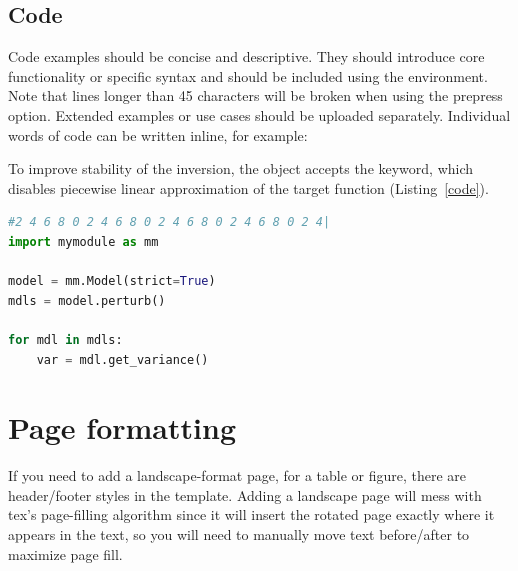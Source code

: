 \documentclass[opinion,breakmath]{seismica}
\begin{document}
	\subsection{Code}

Code examples should be concise and descriptive. They should introduce core functionality or specific syntax and should be included using the  environment. Note that lines longer than 45 characters will be broken when using the prepress option. Extended examples or use cases should be uploaded separately. Individual words of code can be written inline, for example:

To improve stability of the inversion, the  object accepts the  keyword, which disables piecewise linear approximation of the target function (Listing~\ref{code}).

\begin{lstlisting}[caption=Example use of \code{Model}, label=code, language=Python]
#2 4 6 8 0 2 4 6 8 0 2 4 6 8 0 2 4 6 8 0 2 4|
import mymodule as mm

model = mm.Model(strict=True)
mdls = model.perturb()

for mdl in mdls:
	var = mdl.get_variance()
\end{lstlisting}

\section{Page formatting}
If you need to add a landscape-format page, for a table or figure, there are header/footer styles in the template. Adding a landscape page will mess with tex's page-filling algorithm since it will insert the rotated page exactly where it appears in the text, so you will need to manually move text before/after to maximize page fill.




\end{document}
